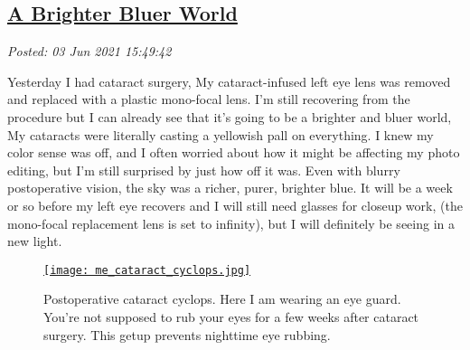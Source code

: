 %

\subsection*{\href{http://analyzethedatanotthedrivel.org/2021/06/03/a-brighter-bluer-world/}{A Brighter Bluer World}}


\noindent\emph{Posted: 03 Jun 2021 15:49:42}
\vspace{6pt}

Yesterday I had cataract surgery, My cataract-infused left eye lens was
removed and replaced with a plastic mono-focal lens. I'm still
recovering from the procedure but I can already see that it's going to
be a brighter and bluer world, My cataracts were literally casting a
yellowish pall on everything. I knew my color sense was off, and I often
worried about how it might be affecting my photo editing, but I'm still
surprised by just how off it was. Even with blurry postoperative vision,
the sky was a richer, purer, brighter blue. It will be a week or so
before my left eye recovers and I will still need glasses for closeup
work, (the mono-focal replacement lens is set to infinity), but I will
definitely be seeing in a new light.



\captionsetup[figure]{labelformat=empty}
\begin{SCfigure}[50]
\centering
\href{https://conceptcontrol.smugmug.com/Themes/Diaries/Cell-Phoning-It-In/i-HvF59SL/A}{\texttt{[image: me\_cataract\_cyclops.jpg]}}
\caption{Postoperative cataract cyclops. Here I am wearing an eye guard.
You're not supposed to rub your eyes for a few weeks after cataract
surgery. This getup prevents nighttime eye rubbing.}
\label{fig:7086x0}
\end{SCfigure}





%
 
